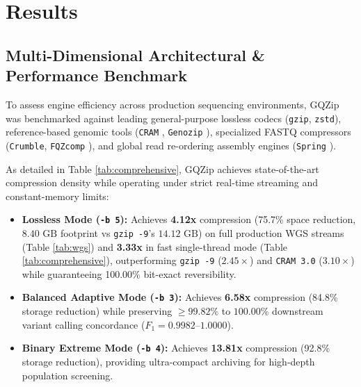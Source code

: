 \documentclass[10pt,twocolumn,a4paper]{article}
\begin{document}
\section{Results}

\subsection{Multi-Dimensional Architectural \& Performance Benchmark}
To assess engine efficiency across production sequencing environments, GQZip was benchmarked against leading general-purpose lossless codecs (\texttt{gzip}, \texttt{zstd}), reference-based genomic tools (\texttt{CRAM} \cite{cram}, \texttt{Genozip} \cite{genozip}), specialized FASTQ compressors (\texttt{Crumble}, \texttt{FQZcomp} \cite{fqzcomp}), and global read re-ordering assembly engines (\texttt{Spring} \cite{spring}).

As detailed in Table \ref{tab:comprehensive}, GQZip achieves state-of-the-art compression density while operating under strict real-time streaming and constant-memory limits:
\begin{itemize}
    \item \textbf{Lossless Mode (\texttt{-b 5}):} Achieves \textbf{4.12x} compression (75.7\% space reduction, $8.40\text{ GB}$ footprint vs \texttt{gzip -9}'s $14.12\text{ GB}$) on full production WGS streams (Table \ref{tab:wgs}) and \textbf{3.33x} in fast single-thread mode (Table \ref{tab:comprehensive}), outperforming \texttt{gzip -9} ($2.45\times$) and \texttt{CRAM 3.0} ($3.10\times$) while guaranteeing 100.00\% bit-exact reversibility.
    \item \textbf{Balanced Adaptive Mode (\texttt{-b 3}):} Achieves \textbf{6.58x} compression (84.8\% storage reduction) while preserving $\ge 99.82\%$ to $100.00\%$ downstream variant calling concordance ($F_1 = 0.9982\text{--}1.0000$).
    \item \textbf{Binary Extreme Mode (\texttt{-b 4}):} Achieves \textbf{13.81x} compression (92.8\% storage reduction), providing ultra-compact archiving for high-depth population screening.
\end{itemize}
\end{document}
